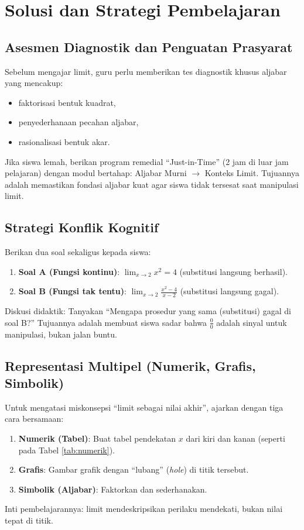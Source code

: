 \documentclass[12pt,a4paper,openany]{book}
\theoremstyle{definition}
\begin{document}
\chapter{Solusi dan Strategi Pembelajaran}

\section{Asesmen Diagnostik dan Penguatan Prasyarat}

Sebelum mengajar limit, guru perlu memberikan tes diagnostik khusus aljabar yang mencakup:
\begin{itemize}
  \item faktorisasi bentuk kuadrat,
  \item penyederhanaan pecahan aljabar,
  \item rasionalisasi bentuk akar.
\end{itemize}
Jika siswa lemah, berikan program remedial ``Just-in-Time'' (2 jam di luar jam pelajaran) dengan modul bertahap: Aljabar Murni $\to$ Konteks Limit. Tujuannya adalah memastikan fondasi aljabar kuat agar siswa tidak tersesat saat manipulasi limit.

\section{Strategi Konflik Kognitif}

Berikan dua soal sekaligus kepada siswa:
\begin{enumerate}
  \item \textbf{Soal A (Fungsi kontinu)}: $\lim_{x \to 2} x^2 = 4$ (substitusi langsung berhasil).
  \item \textbf{Soal B (Fungsi tak tentu)}: $\lim_{x \to 2} \frac{x^2-4}{x-2}$ (substitusi langsung gagal).
\end{enumerate}
Diskusi didaktik: Tanyakan ``Mengapa prosedur yang sama (substitusi) gagal di soal B?'' Tujuannya adalah membuat siswa sadar bahwa $\frac{0}{0}$ adalah sinyal untuk manipulasi, bukan jalan buntu.

\section{Representasi Multipel (Numerik, Grafis, Simbolik)}

Untuk mengatasi miskonsepsi ``limit sebagai nilai akhir'', ajarkan dengan tiga cara bersamaan:
\begin{enumerate}
  \item \textbf{Numerik (Tabel)}: Buat tabel pendekatan $x$ dari kiri dan kanan (seperti pada Tabel \ref{tab:numerik}).
  \item \textbf{Grafis}: Gambar grafik dengan ``lubang'' (\textit{hole}) di titik tersebut.
  \item \textbf{Simbolik (Aljabar)}: Faktorkan dan sederhanakan.
\end{enumerate}
Inti pembelajarannya: limit mendeskripsikan perilaku mendekati, bukan nilai tepat di titik.
\end{document}
